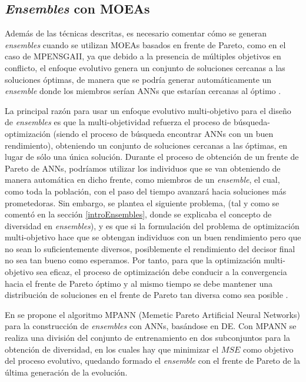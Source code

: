 \subsection{\textit{Ensembles} con MOEAs}\label{ensemblesMOEAS}
\noindent Además de las técnicas descritas, es necesario comentar cómo se generan
\textit{ensembles} cuando se utilizan MOEAs basados en frente de Pareto, como en el caso
de MPENSGAII, ya que debido a la presencia de múltiples objetivos en conflicto, el
enfoque evolutivo genera un conjunto de soluciones cercanas a las soluciones óptimas, de
manera que se podría generar automáticamente un \textit{ensemble} donde los miembros
serían ANNs que estarían cercanas al óptimo \cite{Chandra2004}.

La principal razón para usar un enfoque evolutivo multi-objetivo para el diseño de
\textit{ensembles} es que la multi-objetividad refuerza el proceso de
búsqueda-optimización (siendo el proceso de búsqueda encontrar ANNs con un buen
rendimiento), obteniendo un conjunto de soluciones cercanas a las óptimas, en lugar de
sólo una única solución. Durante el proceso de obtención de un frente de Pareto de ANNs,
podríamos utilizar los individuos que se van obteniendo de manera automática en dicho
frente, como miembros de un \textit{ensemble}, el cual, como toda la población, con el
paso del tiempo avanzará hacia soluciones más prometedoras. Sin embargo, se plantea el
siguiente problema, (tal y como se comentó en la sección \ref{introEnsembles}, donde se
explicaba el concepto de diversidad en \textit{ensembles}), y es que si la
formulación del problema de optimización multi-objetivo hace que se obtengan individuos
con un buen rendimiento pero que no sean lo suficientemente diversos, posiblemente el
rendimiento del decisor final no sea tan bueno como esperamos. Por tanto, para que la
optimización multi-objetivo sea eficaz, el proceso de optimización debe conducir a la
convergencia hacia el frente de Pareto óptimo y al mismo tiempo se debe mantener una
distribución de soluciones en el frente de Pareto tan diversa como sea posible
\cite{Brown2004,Brown2005,Chandra2006b}.

En \cite{Abbass2001,Abbass2003b} se propone el algoritmo MPANN (Memetic Pareto
Artificial Neural Networks) para la construcción
de \textit{ensembles} con ANNs, basándose en DE.
Con MPANN se realiza una división del conjunto de entrenamiento en dos subconjuntos para
la obtención de diversidad, en los cuales hay que minimizar el $MSE$
como objetivo del proceso evolutivo, quedando formado el \textit{ensemble} con el
frente de Pareto de la última generación de la evolución.

